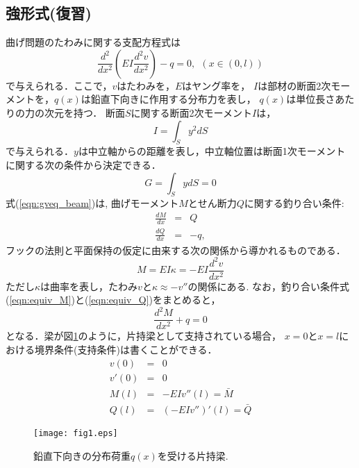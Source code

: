 \documentclass[10pt,a4j]{jarticle}
\begin{document}
\subsection{強形式(復習)}
曲げ問題のたわみに関する支配方程式は
\begin{equation}
	\frac{d^2}{dx^2}\left(EI \frac{d^2v}{dx^2}\right) -q =0, \ \ \left(x\in (0,l)\right)
	\label{eqn:gveq_beam}
\end{equation}
で与えられる．ここで，$v$はたわみを，$E$はヤング率を，
$I$は部材の断面2次モーメントを，$q(x)$は鉛直下向きに作用する分布力を表し，
$q(x)$は単位長さあたりの力の次元を持つ．
断面$S$に関する断面2次モーメント$I$は，
\begin{equation}
	I=\int_S y^2 dS
	\label{eqn:}
\end{equation}
で与えられる．$y$は中立軸からの距離を表し，中立軸位置は断面1次モーメント
に関する次の条件から決定できる．
\begin{equation}
	G=\int _S ydS=0
	\label{eqn:}
\end{equation}
式(\ref{eqn:gveq_beam})は, 曲げモーメント$M$とせん断力$Q$に関する釣り合い条件:
\begin{eqnarray}
	\frac{dM}{dx} &=& Q
	\label{eqn:equiv_M} \\
	\frac{dQ}{dx} &=& -q,
	\label{eqn:equiv_Q}
\end{eqnarray}
フックの法則と平面保持の仮定に由来する次の関係から導かれるものである．
\begin{equation}
	M=EI \kappa= -EI\frac{d^2v}{dx^2}
	\label{eqn:M_k}
\end{equation}
ただし$\kappa$は曲率を表し，たわみ$v$と$\kappa\approx -v''$の関係にある. 
なお，釣り合い条件式(\ref{eqn:equiv_M})と(\ref{eqn:equiv_Q})をまとめると，
\begin{equation}
	\frac{d^2M}{dx^2}+q=0
	\label{eqn:equiv_MQ}
\end{equation}
となる．梁が図\ref{fig:fig2_1}のように，片持梁として支持されている場合，
$x=0$と$x=l$における境界条件(支持条件)は書くことができる．
\begin{eqnarray}
	v (0) &= & 0 
		\label{eqn:BC_v}
	\\
	v' (0) &= & 0 
		\label{eqn:BC_th}
	\\
	M (l) &= & -EI v''(l)=\bar M 
		\label{eqn:BC_M} \\
	Q (l) &= & \left(-EI v''\right)'(l)=\bar Q 
		\label{eqn:BC_Q}
	\label{eqn:BC_Q} 
\end{eqnarray}
\begin{figure}[h]
	\begin{center}
	\texttt{[image: fig1.eps]} 
	\end{center}
	\caption{鉛直下向きの分布荷重$q(x)$を受ける片持梁.} 
	\label{fig:fig2_1}
\end{figure}
\end{document}
